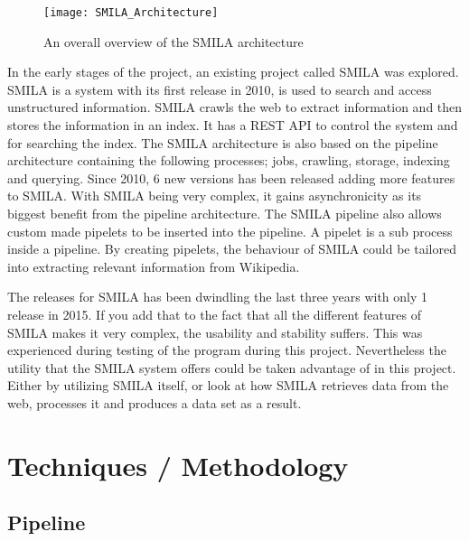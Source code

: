 \begin{figure}[h]
\caption{An overall overview of the SMILA architecture}
\texttt{[image: SMILA\_Architecture]}
\end{figure}



In the early stages of the project, an existing project called SMILA\cite{smila} was explored. SMILA is a system with its first release in 2010, is used to search and access unstructured information. SMILA crawls the web to extract information and then stores the information in an index. It has a REST API to control the system and for searching the index. The SMILA architecture is also based on the pipeline architecture containing the following processes; jobs, crawling, storage, indexing and querying. Since 2010, 6 new versions has been released adding more features to SMILA. With SMILA being very complex, it gains asynchronicity as its biggest benefit from the pipeline architecture. The SMILA pipeline also allows custom made pipelets to be inserted into the pipeline. A pipelet is a sub process inside a pipeline. By creating pipelets, the behaviour of SMILA could be tailored into extracting relevant information from Wikipedia.

The releases for SMILA has been dwindling the last three years with only 1 release in 2015. If you add that to the fact that all the different features of SMILA makes it very complex, the usability and stability suffers. This was experienced during testing of the program during this project.
Nevertheless the utility that the SMILA system offers could be taken advantage of in this project. Either by utilizing SMILA itself, or look at how SMILA retrieves data from the web, processes it and produces a data set as a result.


\section{Techniques / Methodology}

\subsection{Pipeline} \label{pipeline}

